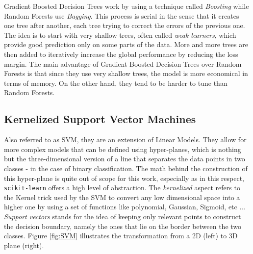 Gradient Boosted Decision Trees work by using a technique called \textit{Boosting} while Random Forests use \textit{Bagging}. This process is serial in the sense that it creates one tree after another, each tree trying to correct the errors of the previous one. The idea is to start with very shallow trees, often called \textit{weak learners}, which provide good prediction only on some parts of the data. More and more trees are then added to iteratively increase the global performance by reducing the loss margin. The main advantage of Gradient Boosted Decision Trees over Random Forests is that since they use very shallow trees, the model is more economical in terms of memory. On the other hand, they tend to be harder to tune than Random Forests.

\subsection{Kernelized Support Vector Machines}

Also referred to as SVM, they are an extension of Linear Models. They allow for more complex models that can be defined using hyper-planes, which is nothing but the three-dimensional version of a line that separates the data points in two classes - in the case of binary classification. The math behind the construction of this hyper-plane is quite out of scope for this work, especially as in this respect, \texttt{scikit-learn} offers a high level of abstraction. The \textit{kernelized} aspect refers to the Kernel trick used by the SVM to convert any low dimensional space into a higher one by using a set of functions like polynomial, Gaussian, Sigmoid, etc ... \textit{Support vectors} stands for the idea of keeping only relevant points to construct the decision boundary, namely the ones that lie on the border between the two classes. Figure \ref{fig:SVM} illustrates the transformation from a 2D (left) to 3D plane (right).

